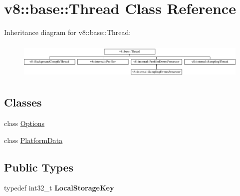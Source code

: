 \hypertarget{classv8_1_1base_1_1Thread}{}\section{v8\+:\+:base\+:\+:Thread Class Reference}
\label{classv8_1_1base_1_1Thread}
Inheritance diagram for v8\+:\+:base\+:\+:Thread\+:\begin{figure}[H]
\begin{center}
\leavevmode
\includegraphics[height=1.787234cm]{classv8_1_1base_1_1Thread}
\end{center}
\end{figure}
\subsection*{Classes}
\begin{DoxyCompactItemize}
\item 
class \mbox{\hyperlink{classv8_1_1base_1_1Thread_1_1Options}{Options}}
\item 
class \mbox{\hyperlink{classv8_1_1base_1_1Thread_1_1PlatformData}{Platform\+Data}}
\end{DoxyCompactItemize}
\subsection*{Public Types}
\begin{DoxyCompactItemize}
\item 
\mbox{\label{classv8_1_1base_1_1Thread_a7cc230d1c9c2c354fb0f6032813f9d0f}} 
typedef int32\+\_\+t {\bfseries Local\+Storage\+Key}
\end{DoxyCompactItemize}
